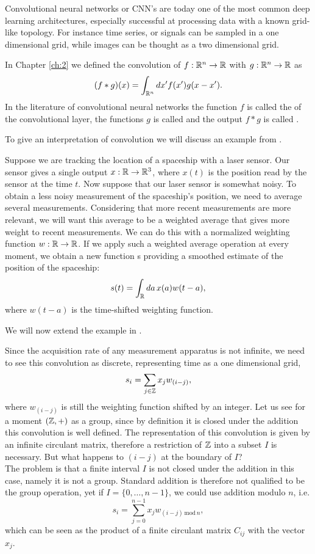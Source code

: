 \documentclass[../3.tex]{subfiles}
\begin{document}
    Convolutional neural networks or CNN's are today one of the most common deep learning architectures, especially successful at processing
    data with a known grid-like topology. For instance time series, or signals can be sampled in a one dimensional grid, while images can be thought as a two dimensional grid.
    
    In Chapter \ref{ch:2} we defined the convolution of $f:\mathbb{R}^n \to \mathbb{R}$ with $g:\mathbb{R}^n \to \mathbb{R}$ as
    \[ (f * g)(x) = \int_{\mathbb{R}^n} dx' f(x')g(x-x'). \]
    In the literature of convolutional neural networks the function $f$ is called the  of the
    convolutional layer, the functions $g$ is called  and the output $f*g$ is called .

    To give an interpretation of convolution we will discuss an example from \cite{deep}.

    \begin{exa}
        \label{exa:circ}
        Suppose we are tracking the location of a spaceship with a laser sensor. Our
        sensor gives a single output $x : \mathbb{R} \to \mathbb{R}^3$, where $x(t)$ is the position read by the sensor at the time $t$.
        Now suppose that our laser sensor is somewhat noisy. To obtain a less noisy
        measurement of the spaceship’s position, we need to average several measurements.
        Considering that more recent measurements are more relevant, we will want this average to
        be a weighted average that gives more weight to recent measurements. 
        We can do this with a normalized weighting function $w:\mathbb{R} \to \mathbb{R}$. If
        we apply such a weighted average operation at every moment, we obtain a new
        function s providing a smoothed estimate of the position of the spaceship:
        \[ s(t) = \int_{\mathbb{R}} da \, x(a)w(t-a), \]
        where $w(t-a)$ is the time-shifted weighting function.

        We will now extend the example in \cite{deep}.

        Since the acquisition rate of any measurement apparatus is not infinite, we need to see this convolution as discrete, representing time as a one dimensional grid,
        \[ s_i = \sum_{j \in \mathbb{Z}} x_j w_{(i-j)}, \]
        where $w_{(i-j)}$ is still the weighting function shifted by an integer.
        Let us see for a moment $(\mathbb{Z},+)$ as a group, since by definition it is closed under the addition this convolution is well defined.
        The representation of this convolution is given by an infinite circulant matrix, therefore a restriction of $\mathbb{Z}$
        into a subset $I$ is necessary. But what happens to $(i-j)$ at the boundary of $I$?\\
        The problem is that a finite interval $I$ is not closed under the addition in this case, namely it is not a group.
        Standard addition is therefore not qualified to be the group operation, yet if $I = \{ 0,\dots,n-1 \}$, we could use
        addition modulo $n$, i.e. 
        \[ s_i = \sum_{j = 0}^{n-1} x_j w_{(i-j) \, \text{mod} \, n},\]
        which can be seen as the product of a finite circulant matrix $C_{ij}$ with the vector $x_j$.
    \end{exa}
\end{document}
